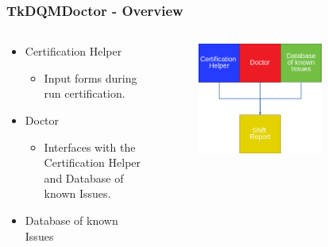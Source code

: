 \documentclass{beamer}
\begin{document}
\begin{frame}
\frametitle{TkDQMDoctor - Overview}
  \begin{columns}[T]
    \begin{column}{.5\textwidth}
     \begin{block}{}

\begin{itemize}
\item Certification Helper
\begin{itemize}
	\item Input forms during run certification.
\end{itemize}
\item Doctor
\begin{itemize}
	\item Interfaces with the Certification Helper and Database of known Issues.
\end{itemize}
\item Database of known Issues
\end{itemize}

   	\end{block}	
    \end{column}
    \begin{column}{.5\textwidth}
    \begin{block}{}
    \begin{figure}[h]
    \phantom{g}
	\includegraphics[width=0.7\textwidth]{figures/overview.png}
			\end{figure}

    \end{block}
    \end{column}
  \end{columns}
\end{frame}
\end{document}
